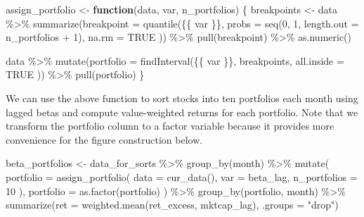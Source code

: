 \documentclass[
]{krantz}
\newenvironment{Shaded}{\begin{snugshade}}{\end{snugshade}}
\newcommand{\AttributeTok}[1]{\textcolor[rgb]{0.61,0.61,0.61}{#1}}
\newcommand{\ConstantTok}[1]{\textcolor[rgb]{0,0,0}{#1}}
\newcommand{\ControlFlowTok}[1]{\textcolor[rgb]{0.27,0.27,0.27}{\textbf{#1}}}
\newcommand{\DecValTok}[1]{\textcolor[rgb]{0.06,0.06,0.06}{#1}}
\newcommand{\FunctionTok}[1]{\textcolor[rgb]{0,0,0}{#1}}
\newcommand{\NormalTok}[1]{#1}
\newcommand{\OtherTok}[1]{\textcolor[rgb]{0.37,0.37,0.37}{#1}}
\newcommand{\SpecialCharTok}[1]{\textcolor[rgb]{0,0,0}{#1}}
\newcommand{\StringTok}[1]{\textcolor[rgb]{0.5,0.5,0.5}{#1}}
\begin{document}
\begin{Shaded}
\begin{Highlighting}[]
\NormalTok{assign\_portfolio }\OtherTok{\textless{}{-}} \ControlFlowTok{function}\NormalTok{(data, var, n\_portfolios) \{}
\NormalTok{  breakpoints }\OtherTok{\textless{}{-}}\NormalTok{ data }\SpecialCharTok{\%\textgreater{}\%}
    \FunctionTok{summarize}\NormalTok{(}\AttributeTok{breakpoint =} \FunctionTok{quantile}\NormalTok{(\{\{ var \}\},}
      \AttributeTok{probs =} \FunctionTok{seq}\NormalTok{(}\DecValTok{0}\NormalTok{, }\DecValTok{1}\NormalTok{, }\AttributeTok{length.out =}\NormalTok{ n\_portfolios }\SpecialCharTok{+} \DecValTok{1}\NormalTok{),}
      \AttributeTok{na.rm =} \ConstantTok{TRUE}
\NormalTok{    )) }\SpecialCharTok{\%\textgreater{}\%}
    \FunctionTok{pull}\NormalTok{(breakpoint) }\SpecialCharTok{\%\textgreater{}\%}
    \FunctionTok{as.numeric}\NormalTok{()}

\NormalTok{  data }\SpecialCharTok{\%\textgreater{}\%}
    \FunctionTok{mutate}\NormalTok{(}\AttributeTok{portfolio =} \FunctionTok{findInterval}\NormalTok{(\{\{ var \}\},}
\NormalTok{      breakpoints,}
      \AttributeTok{all.inside =} \ConstantTok{TRUE}
\NormalTok{    )) }\SpecialCharTok{\%\textgreater{}\%}
    \FunctionTok{pull}\NormalTok{(portfolio)}
\NormalTok{\}}
\end{Highlighting}
\end{Shaded}

We can use the above function to sort stocks into ten portfolios each month using lagged betas and compute value-weighted returns for each portfolio.
Note that we transform the portfolio column to a factor variable because it provides more convenience for the figure construction below.

\begin{Shaded}
\begin{Highlighting}[]
\NormalTok{beta\_portfolios }\OtherTok{\textless{}{-}}\NormalTok{ data\_for\_sorts }\SpecialCharTok{\%\textgreater{}\%}
  \FunctionTok{group\_by}\NormalTok{(month) }\SpecialCharTok{\%\textgreater{}\%}
  \FunctionTok{mutate}\NormalTok{(}
    \AttributeTok{portfolio =} \FunctionTok{assign\_portfolio}\NormalTok{(}
      \AttributeTok{data =} \FunctionTok{cur\_data}\NormalTok{(),}
      \AttributeTok{var =}\NormalTok{ beta\_lag,}
      \AttributeTok{n\_portfolios =} \DecValTok{10}
\NormalTok{    ),}
    \AttributeTok{portfolio =} \FunctionTok{as.factor}\NormalTok{(portfolio)}
\NormalTok{  ) }\SpecialCharTok{\%\textgreater{}\%}
  \FunctionTok{group\_by}\NormalTok{(portfolio, month) }\SpecialCharTok{\%\textgreater{}\%}
  \FunctionTok{summarize}\NormalTok{(}\AttributeTok{ret =} \FunctionTok{weighted.mean}\NormalTok{(ret\_excess, mktcap\_lag), }\AttributeTok{.groups =} \StringTok{"drop"}\NormalTok{)}
\end{Highlighting}
\end{Shaded}
\end{document}
